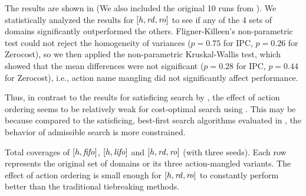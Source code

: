 The results are shown in  (We
also included the original 10 runs from  ).
We statistically analyzed the results for $[h,{\mbox{\textit{rd}}},{\mbox{\textit{ro}}}]$ 
to see if any of the 4 sets of domains
significantly outperformed the others.
Fligner-Killeen's non-parametric test could not reject the homogeneity of variances
($p=0.75$ for IPC, $p=0.26$ for Zerocost), so
we then applied the non-parametric Kruskal-Wallis test,
which showed that the mean differences were not significant
($p=0.28$ for IPC, $p=0.44$ for Zerocost),
i.e., action name mangling did not significantly affect performance.

Thus, in contrast to the results for satisficing search by \cite{vallati2015effective}, 
the effect of action ordering  seems to be relatively weak for cost-optimal search using \astar.
This may be because 
compared to the satisficing, best-first search algorithms evaluated in \cite{vallati2015effective},
the behavior of admissible search is more constrained.

\begin{table}[tb]
 \setlength{\tabcolsep}{0.2em}
 \centering {}
 
 \caption{Total coverages of $[h,{\mbox{\textit{fifo}}}]$, $[h,{\mbox{\textit{lifo}}}]$
 and $[h,{\mbox{\textit{rd}}},{\mbox{\textit{ro}}}]$ (with three seeds). Each row represents the original set of
 domains or its three action-mangled variants. The effect
 of action ordering is small enough for $[h,{\mbox{\textit{rd}}},{\mbox{\textit{ro}}}]$ to
 constantly perform better than the traditional tiebreaking methods.}
 \label{actionordering-robustness}
\end{table}

